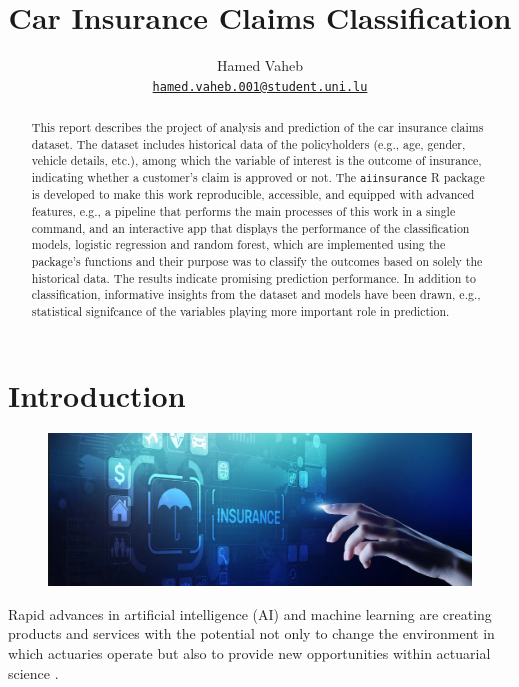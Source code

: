 \documentclass{article}
\title{\color{astral}Car Insurance Claims Classification}
\author{
    Hamed Vaheb\\
  \texttt{\href{mailto:hamed.vaheb.001@student.uni.lu}{\nolinkurl{hamed.vaheb.001@student.uni.lu}}}%
  }
\begin{document}
\maketitle


\begin{abstract}
This report describes the project of analysis and prediction of the car
insurance claims dataset. The dataset includes historical data of the
policyholders (e.g., age, gender, vehicle details, etc.), among which
the variable of interest is the outcome of insurance, indicating whether
a customer's claim is approved or not. The \texttt{aiinsurance} R
package \cite{package} is developed to make this work reproducible,
accessible, and equipped with advanced features, e.g., a pipeline that
performs the main processes of this work in a single command, and an
interactive app that displays the performance of the classification
models, logistic regression and random forest, which are implemented
using the package's functions and their purpose was to classify the
outcomes based on solely the historical data. The results indicate
promising prediction performance. In addition to classification,
informative insights from the dataset and models have been drawn, e.g.,
statistical signifcance of the variables playing more important role in
prediction.
\end{abstract}


\hypertarget{introduction}{%
\section{Introduction}\label{introduction}}

\begin{figure}
\includegraphics[width=0.9\linewidth]{./figures/aiactuary.png}
\end{figure}

Rapid advances in artificial intelligence (AI) and machine learning are
creating products and services with the potential not only to change the
environment in which actuaries operate but also to provide new
opportunities within actuarial science \cite{aiinins}.
\end{document}
